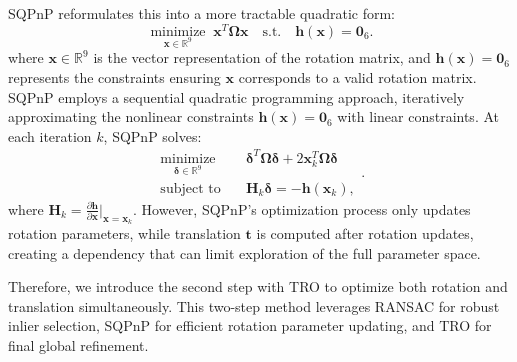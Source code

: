 \documentclass[a4paper,fleqn]{cas-sc}
\begin{document}
SQPnP reformulates this into a more tractable quadratic form:
\begin{equation}
	\underset{\mathbf{x} \in \mathbb{R}^{9}}{\operatorname{minimize}} \; \mathbf{x}^T \mathbf{\Omega} \mathbf{x} 
	\quad \text{s.t.} \quad \mathbf{h}(\mathbf{x}) = \mathbf{0}_6.
\end{equation}
where $\mathbf{x} \in \mathbb{R}^9$ is the vector representation of the rotation matrix, and $\mathbf{h}(\mathbf{x}) = \mathbf{0}_6$ represents the constraints ensuring $\mathbf{x}$ corresponds to a valid rotation matrix. SQPnP employs a sequential quadratic programming approach, iteratively approximating the nonlinear constraints $\mathbf{h}(\mathbf{x}) = \mathbf{0}_6$ with linear constraints. At each iteration $k$, SQPnP solves:
\begin{equation}
	\begin{aligned}
		\underset{\boldsymbol{\delta} \in \mathbb{R}^{9}}{\operatorname{minimize}} \quad & \boldsymbol{\delta}^T \mathbf{\Omega} \boldsymbol{\delta} + 2\mathbf{x}_k^T \mathbf{\Omega} \boldsymbol{\delta} \\
		\text{subject to} \quad & \mathbf{H}_k \boldsymbol{\delta} = -\mathbf{h}(\mathbf{x}_k),
	\end{aligned}.
\end{equation}
where $\mathbf{H}_k = \frac{\partial \mathbf{h}}{\partial \mathbf{x}}|_{\mathbf{x}=\mathbf{x}_k}$. However, SQPnP's optimization process only updates rotation parameters, while translation $\mathbf{t}$ is computed after rotation updates, creating a dependency that can limit exploration of the full parameter space.

Therefore, we introduce the second step with TRO to optimize both rotation and translation simultaneously. This two-step method leverages RANSAC for robust inlier selection, SQPnP for efficient rotation parameter updating, and TRO for final global refinement.
\end{document}

